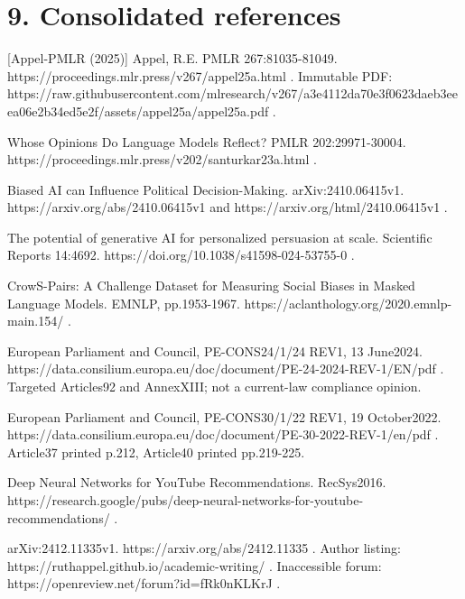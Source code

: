 \documentclass[10pt]{article}
\begin{document}
\section*{9. Consolidated references}
[Appel-PMLR (2025)] Appel, R.E. PMLR 267:81035-81049. https://proceedings.mlr.press/v267/appel25a.html . Immutable PDF: https://raw.githubusercontent.com/mlresearch/v267/a3e4112da70e3f0623daeb3eeea06e2b34ed5e2f/assets/appel25a/appel25a.pdf .\par
[Santurkar et al. (2023)] Whose Opinions Do Language Models Reflect? PMLR 202:29971-30004. https://proceedings.mlr.press/v202/santurkar23a.html .\par
[Fisher et al. (2024)] Biased AI can Influence Political Decision-Making. arXiv:2410.06415v1. https://arxiv.org/abs/2410.06415v1 and https://arxiv.org/html/2410.06415v1 .\par
[Matz et al. (2024)] The potential of generative AI for personalized persuasion at scale. Scientific Reports 14:4692. https://doi.org/10.1038/s41598-024-53755-0 .\par
[Nangia et al. (2020)] CrowS-Pairs: A Challenge Dataset for Measuring Social Biases in Masked Language Models. EMNLP, pp.1953-1967. https://aclanthology.org/2020.emnlp-main.154/ .\par
[AI Act signed text (2024)] European Parliament and Council, PE-CONS24/1/24 REV1, 13 June2024. https://data.consilium.europa.eu/doc/document/PE-24-2024-REV-1/EN/pdf . Targeted Articles92 and AnnexXIII; not a current-law compliance opinion.\par
[DSA signed text (2022)] European Parliament and Council, PE-CONS30/1/22 REV1, 19 October2022. https://data.consilium.europa.eu/doc/document/PE-30-2022-REV-1/en/pdf . Article37 printed p.212, Article40 printed pp.219-225.\par
[Covington et al. (2016)] Deep Neural Networks for YouTube Recommendations. RecSys2016. https://research.google/pubs/deep-neural-networks-for-youtube-recommendations/ .\par
[Appel-arXiv (2024)] arXiv:2412.11335v1. https://arxiv.org/abs/2412.11335 . Author listing: https://ruthappel.github.io/academic-writing/ . Inaccessible forum: https://openreview.net/forum?id=fRk0nKLKrJ .\par
\end{document}
